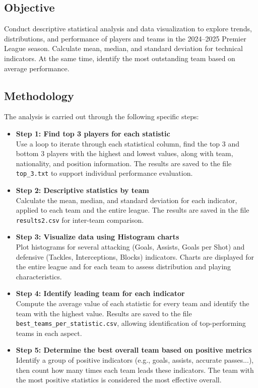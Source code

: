 \documentclass[12pt,a4paper]{article}
\begin{document}
\subsection{Objective}
Conduct descriptive statistical analysis and data visualization to explore trends, distributions, and performance of players and teams in the 2024–2025 Premier League season. Calculate mean, median, and standard deviation for technical indicators. At the same time, identify the most outstanding team based on average performance.

\subsection{Methodology}
The analysis is carried out through the following specific steps:

\begin{itemize}
    \item \textbf{Step 1: Find top 3 players for each statistic} \\
    Use a loop to iterate through each statistical column, find the top 3 and bottom 3 players with the highest and lowest values, along with team, nationality, and position information. The results are saved to the file \texttt{top\_3.txt} to support individual performance evaluation.

    \item \textbf{Step 2: Descriptive statistics by team} \\
    Calculate the mean, median, and standard deviation for each indicator, applied to each team and the entire league. The results are saved in the file \texttt{results2.csv} for inter-team comparison.

    \item \textbf{Step 3: Visualize data using Histogram charts} \\
    Plot histograms for several attacking (Goals, Assists, Goals per Shot) and defensive (Tackles, Interceptions, Blocks) indicators. Charts are displayed for the entire league and for each team to assess distribution and playing characteristics.

    \item \textbf{Step 4: Identify leading team for each indicator} \\
    Compute the average value of each statistic for every team and identify the team with the highest value. Results are saved to the file \texttt{best\_teams\_per\_statistic.csv}, allowing identification of top-performing teams in each aspect.

    \item \textbf{Step 5: Determine the best overall team based on positive metrics} \\
    Identify a group of positive indicators (e.g., goals, assists, accurate passes...), then count how many times each team leads these indicators. The team with the most positive statistics is considered the most effective overall.
\end{itemize}
\end{document}

